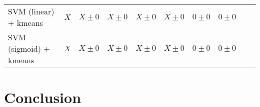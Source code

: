 \documentclass[twocolumn,10pt]{article}
\begin{document}
\begin{table*}[htb]
{\begin{tabular}{@{}lccccccccl@{}}
      SVM (linear) + kmeans     & $X$        & $X \pm 0$                         & $X \pm 0$                    & $X \pm 0$                   & $X \pm 0$         & $0 \pm 0$                    & $0 \pm 0$\\
      SVM (sigmoid) + kmeans    & $X$        & $X \pm 0$                         & $X \pm 0$                    & $X \pm 0$                   & $X \pm 0$         & $0 \pm 0$                    & $0 \pm 0$\\
      \bottomrule
      \end{tabular}
    }
    \label{table:gene_expression_result}
      \vspace{-\baselineskip}
  \end{table*}
  
\section{Conclusion}



\end{document}
